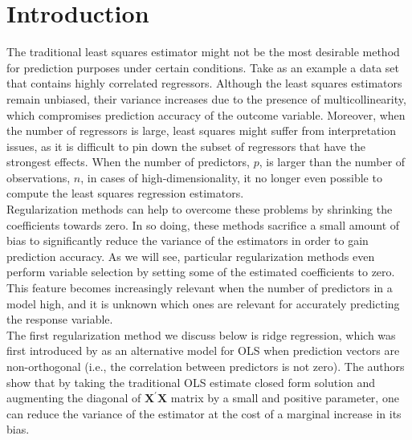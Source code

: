 \section{Introduction}
The traditional least squares estimator might not be the most desirable method for prediction purposes under certain conditions. Take as an example a data set that contains highly correlated regressors. Although the least squares estimators remain unbiased, their variance increases due to the presence of multicollinearity, which compromises prediction accuracy of the outcome variable. Moreover, when the number of regressors is large, least squares might suffer from interpretation issues, as it is difficult to pin down the subset of regressors that have the strongest effects. When the number of predictors, $p$, is larger than the number of observations, $n$, in cases of high-dimensionality, it no longer even possible to compute the least squares regression estimators. \\

\noindent Regularization methods can help to overcome these problems by shrinking the coefficients towards zero. In so doing, these methods sacrifice a small amount of bias to significantly reduce the variance of the estimators in order to gain prediction accuracy. As we will see, particular regularization methods even perform variable selection by setting some of the estimated coefficients to zero. This feature becomes increasingly relevant when the number of predictors in a model high, and it is unknown which ones are relevant for accurately predicting the response variable.\\

\noindent The first regularization method we discuss below is ridge regression, which was first introduced by \cite{hoerl1970ridge1} as an alternative model for OLS when prediction vectors are non-orthogonal (i.e., the correlation between predictors is not zero). The authors show that by taking the traditional OLS estimate closed form solution and augmenting the diagonal of $\mathbf{X}^{\prime} \mathbf{X}$ matrix by a small and positive parameter, one can reduce the variance of the estimator at the cost of a marginal increase in its bias. %
\\


